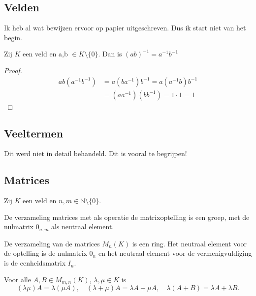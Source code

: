 \subsection{Velden}

Ik heb al wat bewijzen ervoor op papier uitgeschreven. Dus ik start niet van het begin.

\begin{lemma}[ 1.1.8 (ix)]
    Zij \(K\) een veld en a,b \(\in K \setminus \{0\}\). Dan is \((ab)^{-1} = a^{-1} b^{-1}\)
\end{lemma}
\begin{proof}
    \begin{align*}
        ab(a^{-1} b^{-1}) &= a(ba^{-1})b^{-1}
        = a(a^{-1}b)b^{-1} \\
        &= (aa^{-1})(bb^{-1})
        = 1 \cdot 1
        = 1
    \end{align*}
\end{proof}

\subsection{Veeltermen}

Dit werd niet in detail behandeld. Dit is vooral te begrijpen!

\subsection{Matrices}

Zij \(K\) een veld en \(n,m \in \mathds{N} \setminus \{0\}.\)

\begin{lemma}[i]

    De verzameling matrices met als operatie de matrixoptelling is een groep,
    met de nulmatrix \(0_{n,m}\) als neutraal element.
\end{lemma}

\begin{lemma}[ii]
    De verzameling van de matrices $M_n(K)$ is een ring. Het neutraal element voor de optelling is de nulmatrix $0_n$ en het neutraal element voor de vermenigvuldiging is de eenheidsmatrix $I_n$.
\end{lemma}

\begin{lemma}[iii]
    Voor alle $A, B \in M_{m,n}(K)$, $\lambda, \mu \in K$ is
    \[ (\lambda\mu)A = \lambda(\mu A), \quad (\lambda + \mu)A = \lambda A + \mu A, \quad \lambda(A + B) = \lambda A + \lambda B. \]
\end{lemma}

